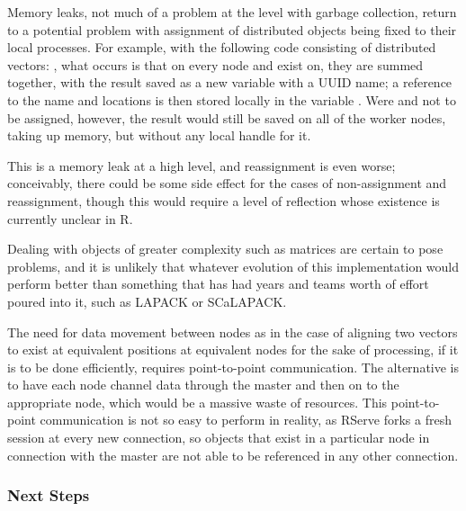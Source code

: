 Memory leaks, not much of a problem at the \R{} level with garbage
collection, return to a potential problem with assignment of distributed
objects being fixed to their local \R{} processes. For example, with the
following code consisting of distributed vectors:
, what occurs is that on every node
 and  exist on, they are summed together, with the
result saved as a new variable with a UUID name; a reference to the name
and locations is then stored locally in the variable . Were
 and  not to be assigned, however, the result would
still be saved on all of the worker nodes, taking up memory, but without
any local handle for it.

This is a memory leak at a high level, and reassignment is even worse;
conceivably, there could be some side effect for the cases of
non-assignment and reassignment, though this would require a level of
reflection whose existence is currently unclear in R.

Dealing with objects of greater complexity such as matrices are certain
to pose problems, and it is unlikely that whatever evolution of this
implementation would perform better than something that has had years
and teams worth of effort poured into it, such as LAPACK or SCaLAPACK.

The need for data movement between nodes as in the case of aligning two
vectors to exist at equivalent positions at equivalent nodes for the
sake of processing, if it is to be done efficiently, requires
point-to-point communication. The alternative is to have each node
channel data through the master and then on to the appropriate node,
which would be a massive waste of resources. This point-to-point
communication is not so easy to perform in reality, as RServe forks a
fresh \R{} session at every new connection, so objects that exist in a
particular node in connection with the master are not able to be
referenced in any other connection.

\subsubsection{Next Steps}\label{next-steps}

